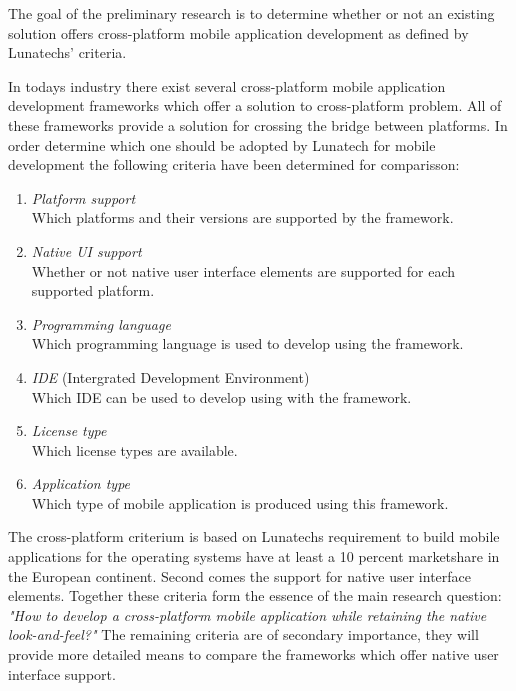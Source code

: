
The goal of the preliminary research is to determine whether or not an existing solution offers cross-platform mobile application development as defined by Lunatechs' criteria.

In todays industry there exist several cross-platform mobile application development frameworks which offer a solution to cross-platform problem. All of these frameworks provide a solution for crossing the bridge between platforms. In order determine which one should be adopted by Lunatech for mobile development the following criteria have been determined for comparisson:

\begin{enumerate}
\item \emph{Platform support}\\
Which platforms and their versions are supported by the framework.
\item \emph{Native UI support}\\
Whether or not native user interface elements are supported for each supported platform.
\item \emph{Programming language}\\
Which programming language is used to develop using the framework.
\item \emph{IDE} (Intergrated Development Environment)\\
Which IDE can be used to develop using with the framework.
\item \emph{License type}\\
Which license types are available.
\item \emph{Application type}\\
Which type of mobile application is produced using this framework.
\end{enumerate}

The cross-platform criterium is based on Lunatechs requirement to build mobile applications for the operating systems have at least a 10 percent marketshare in the European continent. Second comes the support for native user interface elements. Together these criteria form the essence of the main research question: \emph{"How to develop a cross-platform mobile application while retaining the native look-and-feel?"}
The remaining criteria are of secondary importance, they will provide more detailed means to compare the frameworks which offer native user interface support.

